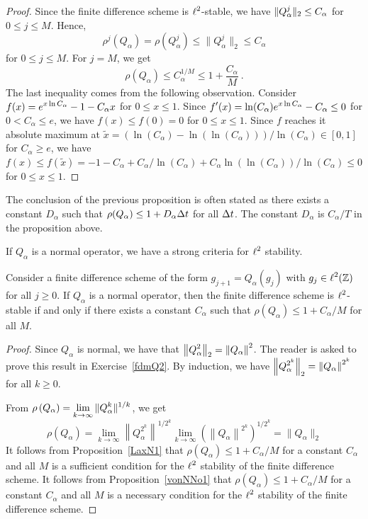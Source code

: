 \begin{proof}
Since the finite difference scheme is $\displaystyle \ell^2$-stable, we have
$\displaystyle \|Q_\alpha^j\|_2 \leq C_\alpha$ for $0\leq j \leq M$.
Hence,
\[
  \rho^j(Q_\alpha) = \rho(Q_\alpha^j) \leq \|Q_\alpha^j\|_2 \leq C_\alpha
\]
for $0\leq j \leq M$.  For $j=M$, we get
\[
  \rho(Q_\alpha) \leq C_\alpha^{1/M} \leq 1 + \frac{C_\alpha}{M} \ .
\]
The last inequality comes from the following observation.
Consider $\displaystyle f(x) = e^{x\ln{C_\alpha}} - 1 - C_\alpha x$ for
$0 \leq x \leq 1$.  Since
$\displaystyle f'(x) = \ln(C_\alpha) e^{x\ln{C_\alpha}} - C_\alpha \leq 0$ for
$0 < C_\alpha \leq e$, we have $f(x) \leq f(0) = 0$ for $0\leq x \leq 1$.
Since $f$ reaches it absolute maximum at
$\tilde{x} = (\ln(C_\alpha) - \ln(\ln(C_\alpha)))/\ln(C_\alpha) \in [0,1]$
for $C_\alpha \geq e$, we have
$f(x) \leq f(\tilde{x}) = -1 -C_\alpha + C_\alpha/\ln(C_\alpha) + C_\alpha
\ln(\ln(C_\alpha))/\ln(C_\alpha) \leq 0$ for $0\leq x \leq 1$.
\end{proof}

\begin{rmk}
The conclusion of the previous proposition is often stated as
there exists a constant $D_\alpha$ such that
$\rho(Q_\alpha) \leq 1 + D_\alpha \Delta{t}$ for all $\Delta{t}$.
The constant $D_\alpha$ is $C_\alpha/T$ in the proposition above. 
\end{rmk}

If $Q_\alpha$ is a normal operator, we have a strong criteria for
$\displaystyle \ell^2$ stability.

\begin{prop}[Lax]
Consider a finite difference scheme of the form $g_{j+1} = Q_\alpha(g_j)$
with $\displaystyle g_j \in \ell^2(\mathbb{Z})$ for all $j \geq 0$.
If $Q_\alpha$ is a normal operator, then the finite difference scheme is
$\displaystyle \ell^2$-stable if and only if there exists a constant
$C_\alpha$ such that $\rho(Q_\alpha) \leq 1 + C_\alpha/M$ for all $M$.
\end{prop}

\begin{proof}
Since $Q_\alpha$ is normal, we have that
$\displaystyle \left\|Q_\alpha^2 \right\|_2 = \left\|Q_\alpha\right\|^2$.
The reader is asked to prove this result in Exercise~\ref{fdmQ2}.  By
induction, we have
$\displaystyle \left\|Q_\alpha^{2^k} \right\|_2 = \left\|Q_\alpha\right\|^{2^k}$
for all $k\geq 0$.

From $\displaystyle \rho\left(Q_\alpha\right)
= \lim_{k\to \infty} \|Q_\alpha^k\|^{1/k}$, we get
\[
\rho\left(Q_\alpha\right)
= \lim_{k\to \infty} \left\|Q_\alpha^{2^k}\right\|^{1/2^k}
\lim_{k\to \infty} \left(\left\|Q_\alpha\right\|^{2^k}\right)^{1/2^k}
= \|Q_\alpha\|_2
\]
It follows from Proposition~\ref{LaxN1} that
$\rho\left(Q_\alpha\right) \leq 1 + C_\alpha/M$ for a constant $C_\alpha$
and all $M$ is a sufficient condition for the
$\displaystyle \ell^2$ stability of
the finite difference scheme.  It follows from
Proposition~\ref{vonNNo1} that
$\rho\left(Q_\alpha\right) \leq 1 + C_\alpha/M$ for a constant $C_\alpha$
and all $M$ is a necessary condition for the $\displaystyle \ell^2$
stability of the finite difference scheme.
\end{proof}

